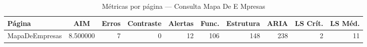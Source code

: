 \begin{table}[htbp]
  \centering
  \caption{Métricas por página — Consulta Mapa De E Mpresas}
  \label{tab:flow_consulta_mapa_de_e_mpresas}
  \small
  \begin{tabular}{lcrrrrrrrr}
\toprule
Página & AIM & Erros & Contraste & Alertas & Func. & Estrutura & ARIA & LS Crít. & LS Méd. \\
\midrule
MapaDeEmpresas & 8.500000 & 7 & 0 & 12 & 106 & 148 & 238 & 2 & 11 \\
\bottomrule
\end{tabular}
\end{table}
